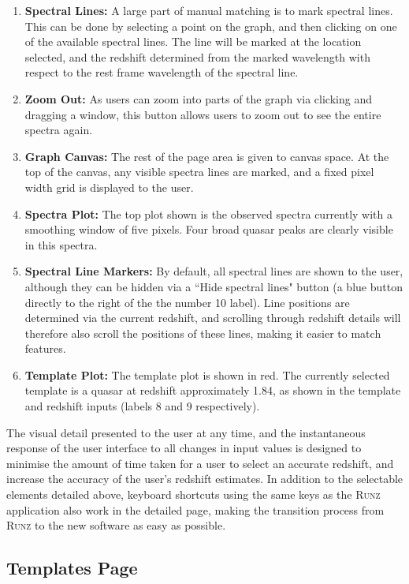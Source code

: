 \documentclass[titlesmallcaps, examinerscopy, copyrightpage]{uqthesis}
\newcommand{\runz}{\textsc{Runz}}
\begin{document}
\begin{enumerate}
\item \textbf{Spectral Lines:} A large part of manual matching is to mark spectral lines. This can be done by selecting a point on the graph, and then clicking on one of the available spectral lines. The line will be marked at the location selected, and the redshift determined from the marked wavelength with respect to the rest frame wavelength of the spectral line.
\item \textbf{Zoom Out:} As users can zoom into parts of the graph via clicking and dragging a window, this button allows users to zoom out to see the entire spectra again.
\item \textbf{Graph Canvas:} The rest of the page area is given to canvas space. At the top of the canvas, any visible spectra lines are marked, and a fixed pixel width grid is displayed to the user.
\item \textbf{Spectra Plot:} The top plot shown is the observed spectra currently with a smoothing window of five pixels. Four broad quasar peaks are clearly visible in this spectra.
\item \textbf{Spectral Line Markers:} By default, all spectral lines are shown to the user, although they can be hidden via a ``Hide spectral lines" button (a blue button directly to the right of the the number 10 label). Line positions are determined via the current redshift, and scrolling through redshift details will therefore also scroll the positions of these lines, making it easier to match features.
\item \textbf{Template Plot:} The template plot is shown in red. The currently selected template is a quasar at redshift approximately 1.84, as shown in the template and redshift inputs (labels 8 and 9 respectively).
\end{enumerate}

The visual detail presented to the user at any time, and the instantaneous response of the user interface to all changes in input values is designed to minimise the amount of time taken for a user to select an accurate redshift, and increase the accuracy of the user's redshift estimates. In addition to the selectable elements detailed above, keyboard shortcuts using the same keys as the \runz{} application also work in the detailed page, making the transition process from \runz{} to the new software as easy as possible.

\pagebreak
\subsection{Templates Page}
\end{document}
